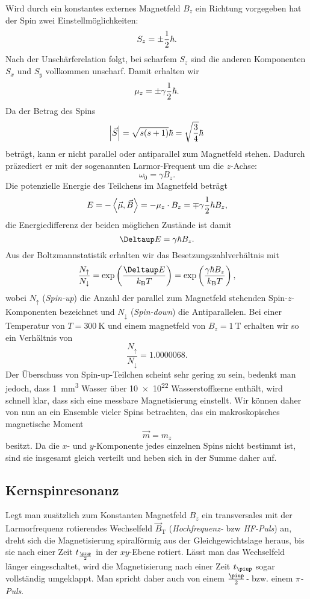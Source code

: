 \documentclass[
    11pt,
    ngerman
]{scrreprt}
\begin{document}
Wird durch ein konstantes externes Magnetfeld $B_z$ ein Richtung vorgegeben hat
der Spin zwei Einstellmöglichkeiten:
\[
    S_z = \pm\frac 12\hbar.
\]
Nach der Unschärferelation folgt, bei scharfem $S_z$ sind die anderen
Komponenten $S_x$ und $S_y$ vollkommen unscharf. Damit erhalten wir
\[
    \mu_z = \pm\gamma\frac 12\hbar.
\]
Da der Betrag des Spins 
\[
    \abs{\vec S} = \sqrt{s(s+1)}\hbar = \sqrt{\frac34}\hbar
\]
beträgt, kann er nicht parallel oder antiparallel zum Magnetfeld stehen.
Dadurch präzediert er mit der sogenannten Larmor-Frequent um die $z$-Achse:
\[
    \omega_0 = \gamma B_z.
\]
Die potenzielle Energie des Teilchens im Magnetfeld beträgt
\[
    E = -\left\langle\vec\mu,\vec B\right\rangle = -\mu_z \cdot B_z = \mp\gamma\frac 12\hbar B_z,
\]
die Energiedifferenz der beiden möglichen Zustände ist damit
\[
    \Deltaup E = \gamma\hbar B_z.
\]
Aus der Boltzmannstatistik erhalten wir das Besetzungszahlverhältnis mit
\[
    \frac{N_\uparrow}{N_\downarrow} = \dexp{\frac{\Deltaup E}{k_\text{B}T}} =
    \dexp{\frac{\gamma\hbar B_z}{k_\text{B}T}},
\]
wobei $N_\uparrow$ (\emph{Spin-up}) die Anzahl der parallel zum Magnetfeld
stehenden Spin-$z$-Komponenten bezeichnet und $N_\downarrow$ (\emph{Spin-down})
die Antiparallelen. Bei einer Temperatur von $T = \SI{300}{\kelvin}$ und einem
magnetfeld von $B_z = \SI{1}{\tesla}$ erhalten wir so ein Verhältnis von
\[
    \frac{N_\uparrow}{N_\downarrow} = \num{1.0000068}.
\]
Der Überschuss von Spin-up-Teilchen scheint sehr gering zu sein, bedenkt man
jedoch, dass \SI{1}{\milli\meter\cubed} Wasser über \num{10e22} Wasserstoffkerne
enthält, wird schnell klar, dass sich eine messbare Magnetisierung einstellt.
Wir können daher von nun an ein Ensemble vieler Spins betrachten, das ein
makroskopisches magnetische Moment
\[
    \vec m = m_z
\]
besitzt. Da die $x$- und $y$-Komponente jedes einzelnen Spins nicht bestimmt ist, sind sie insgesamt gleich verteilt und heben sich in der Summe daher auf.

\subsection{Kernspinresonanz}

Legt man zusätzlich zum Konstanten Magnetfeld $B_z$ ein transversales mit der
Larmorfrequenz rotierendes Wechselfeld $\vec B_\text{T}$ (\emph{Hochfrequenz-}
bzw \emph{HF-Puls}) an, dreht sich die Magnetisierung spiralförmig aus der
Gleichgewichtslage heraus, bis sie nach einer Zeit $t_{\frac\piup2}$ in der
$xy$-Ebene rotiert. Lässt man das Wechselfeld länger eingeschaltet, wird die
Magnetisierung nach einer Zeit $t_{\piup}$ sogar vollständig umgeklappt. Man
spricht daher auch von einem \emph{$\frac\piup2$-} bzw. einem
\emph{$\pi$-Puls}.
\end{document}
